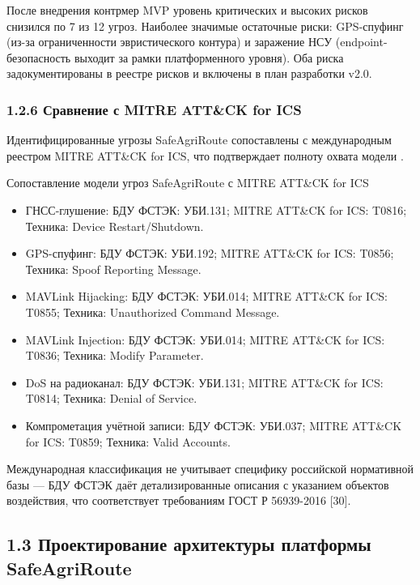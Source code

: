 \documentclass[14pt,a4paper]{extarticle}
\begin{document}
После внедрения контрмер MVP уровень критических и высоких рисков снизился по 7 из 12 угроз. Наиболее значимые остаточные риски: GPS-спуфинг (из-за ограниченности эвристического контура) и заражение НСУ (endpoint-безопасность выходит за рамки платформенного уровня). Оба риска задокументированы в реестре рисков и включены в план разработки v2.0.

\hypertarget{ux441ux440ux430ux432ux43dux435ux43dux438ux435-ux441-mitre-attck-for-ics}{%
\subsubsection{1.2.6 Сравнение с MITRE ATT\&CK for ICS}\label{ux441ux440ux430ux432ux43dux435ux43dux438ux435-ux441-mitre-attck-for-ics}}

Идентифицированные угрозы SafeAgriRoute сопоставлены с международным реестром MITRE ATT\&CK for ICS, что подтверждает полноту охвата модели .

Сопоставление модели угроз SafeAgriRoute с MITRE ATT\&CK for ICS
\begin{itemize}
\item ГНСС-глушение: БДУ ФСТЭК: УБИ.131; MITRE ATT\&CK for ICS: T0816; Техника: Device Restart/Shutdown.
\item GPS-спуфинг: БДУ ФСТЭК: УБИ.192; MITRE ATT\&CK for ICS: T0856; Техника: Spoof Reporting Message.
\item MAVLink Hijacking: БДУ ФСТЭК: УБИ.014; MITRE ATT\&CK for ICS: T0855; Техника: Unauthorized Command Message.
\item MAVLink Injection: БДУ ФСТЭК: УБИ.014; MITRE ATT\&CK for ICS: T0836; Техника: Modify Parameter.
\item DoS на радиоканал: БДУ ФСТЭК: УБИ.131; MITRE ATT\&CK for ICS: T0814; Техника: Denial of Service.
\item Компрометация учётной записи: БДУ ФСТЭК: УБИ.037; MITRE ATT\&CK for ICS: T0859; Техника: Valid Accounts.
\end{itemize}


Международная классификация не учитывает специфику российской нормативной базы --- БДУ ФСТЭК даёт детализированные описания с указанием объектов воздействия, что соответствует требованиям ГОСТ Р 56939-2016 {[}30{]}.


\hypertarget{ux43fux440ux43eux435ux43aux442ux438ux440ux43eux432ux430ux43dux438ux435-ux430ux440ux445ux438ux442ux435ux43aux442ux443ux440ux44b-ux43fux43bux430ux442ux444ux43eux440ux43cux44b-safeagriroute}{%
\subsection{1.3 Проектирование архитектуры платформы SafeAgriRoute}\label{ux43fux440ux43eux435ux43aux442ux438ux440ux43eux432ux430ux43dux438ux435-ux430ux440ux445ux438ux442ux435ux43aux442ux443ux440ux44b-ux43fux43bux430ux442ux444ux43eux440ux43cux44b-safeagriroute}}
\end{document}
